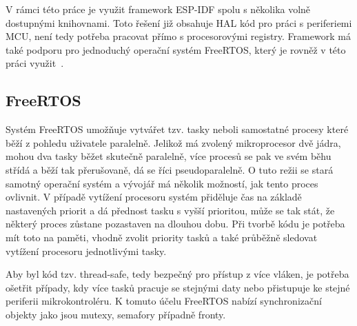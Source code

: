     V rámci této práce je využit framework ESP-IDF spolu s několika volně dostupnými knihovnami. Toto řešení již obsahuje HAL kód pro práci s periferiemi MCU, není tedy potřeba pracovat přímo s procesorovými registry. Framework má také podporu pro jednoduchý operační systém FreeRTOS, který je rovněž v této práci využit~\cite{espressif-idf}. 

    \subsection{FreeRTOS}
        Systém FreeRTOS umožňuje vytvářet tzv. tasky neboli samostatné procesy které běží z pohledu uživatele paralelně. Jelikož má zvolený mikroprocesor dvě jádra, mohou dva tasky běžet skutečně paralelně, více procesů se pak ve svém běhu střídá a běží tak přerušovaně, dá se říci pseudoparalelně. O tuto režii se stará samotný operační systém a vývojář má několik možností, jak tento proces ovlivnit. V případě vytížení procesoru systém přiděluje čas na základě nastavených priorit a dá přednost tasku s vyšší prioritou, může se tak stát, že některý proces zůstane pozastaven na dlouhou dobu. Při tvorbě kódu je potřeba mít toto na paměti, vhodně zvolit priority tasků a také průběžně sledovat vytížení procesoru jednotlivými tasky.  

        Aby byl kód tzv. thread-safe, tedy bezpečný pro přístup z více vláken, je potřeba ošetřit případy, kdy více tasků pracuje se stejnými daty nebo přistupuje ke stejné periferii mikrokontroléru. K tomuto účelu FreeRTOS nabízí synchronizační objekty jako jsou mutexy, semafory případně fronty. 

